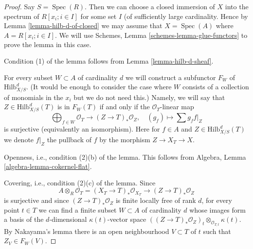 \documentclass{stacks-project}
\theoremstyle{plain}
\theoremstyle{definition}
\theoremstyle{remark}
\numberwithin{equation}{subsection}
\def\Spec{\mathop{\mathrm{Spec}}}
\def\Hilbfunctor{\mathrm{Hilb}}
\begin{document}
\begin{proof}
Say $S = \Spec(R)$. Then we can choose a closed immersion of $X$
into the spectrum of $R[x_i; i \in I]$ for some set $I$ (of sufficiently
large cardinality. Hence by Lemma \ref{lemma-hilb-d-of-closed}
we may assume that $X = \Spec(A)$ where $A = R[x_i; i \in I]$.
We will use Schemes, Lemma \ref{schemes-lemma-glue-functors} to prove the
lemma in this case.

\medskip\noindent
Condition (1) of the lemma follows from Lemma \ref{lemma-hilb-d-sheaf}.

\medskip\noindent
For every subset $W \subset A$ of cardinality $d$ we will
construct a subfunctor $F_W$ of $\Hilbfunctor^d_{X/S}$.
(It would be enough to consider the case where $W$ consists of a
collection of monomials in the $x_i$ but we do not need this.)
Namely, we will say that $Z \in \Hilbfunctor^d_{X/S}(T)$ is in $F_W(T)$
if and only if the $\mathcal{O}_T$-linear map
$$
\bigoplus\nolimits_{f \in W} \mathcal{O}_T
\longrightarrow
(Z \to T)_*\mathcal{O}_Z,\quad
(g_f) \longmapsto \sum g_f f|_Z
$$
is surjective (equivalently an isomorphism). Here for $f \in A$
and $Z \in \Hilbfunctor^d_{X/S}(T)$ we denote $f|_Z$ the pullback of $f$
by the morphism $Z \to X_T \to X$.

\medskip\noindent
Openness, i.e., condition (2)(b) of the lemma. This follows from
Algebra, Lemma \ref{algebra-lemma-cokernel-flat}.

\medskip\noindent
Covering, i.e., condition (2)(c) of the lemma. Since
$$
A \otimes_R \mathcal{O}_T =
(X_T \to T)_*\mathcal{O}_{X_T} \to (Z \to T)_*\mathcal{O}_Z
$$
is surjective and since $(Z \to T)_*\mathcal{O}_Z$ is finite locally
free of rank $d$, for every point $t \in T$ we can find a finite
subset $W \subset A$ of cardinality $d$ whose images form a basis
of the $d$-dimensional $\kappa(t)$-vector space
$((Z \to T)_*\mathcal{O}_Z)_t \otimes_{\mathcal{O}_{T, t}} \kappa(t)$.
By Nakayama's lemma there is an open neighbourhood $V \subset T$
of $t$ such that $Z_V \in F_W(V)$.


\end{proof}
\end{document}
